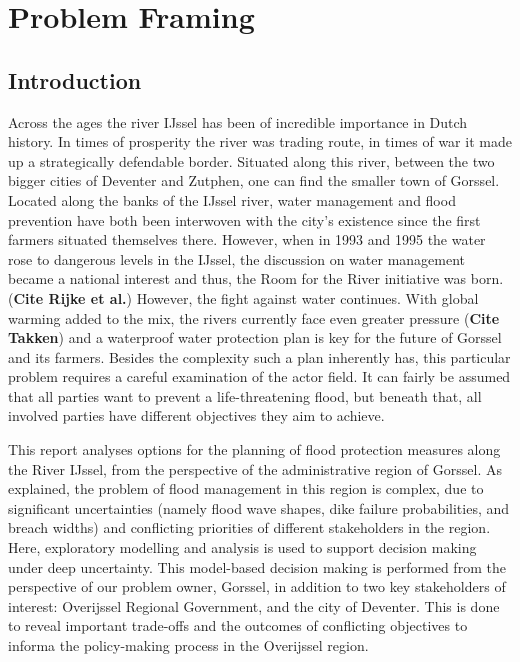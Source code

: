 \section{Problem Framing}
\label{s:prob_frame}
\subsection{Introduction}
Across the ages the river IJssel has been of incredible importance in Dutch history. In times of prosperity the river was trading route, in times of war it made up a strategically defendable border. Situated along this river, between the two bigger cities of Deventer and Zutphen, one can find the smaller town of Gorssel. Located along the banks of the IJssel river, water management and flood prevention have both been interwoven with the city's existence since the first farmers situated themselves there. However, when in 1993 and 1995 the water rose to dangerous levels in the IJssel, the discussion on water management became a national interest and thus, the Room for the River initiative was born. (\textbf{Cite Rijke et al.}) However, the fight against water continues. With global warming added to the mix, the rivers currently face even greater pressure (\textbf{Cite Takken}) and a waterproof water protection plan is key for the future of Gorssel and its farmers. Besides the complexity such a plan inherently has, this particular problem requires a careful examination of the actor field. It can fairly be assumed that all parties want to prevent a life-threatening flood, but beneath that, all involved parties have different objectives they aim to achieve. 

This report analyses options for the planning of flood protection measures along the River IJssel, from the perspective of the administrative region of Gorssel. As explained, the problem of flood management in this region is complex, due to significant uncertainties (namely flood wave shapes, dike failure probabilities, and breach widths) and conflicting priorities of different stakeholders in the region. Here, exploratory modelling and analysis is used to support decision making under deep uncertainty. This model-based decision making is performed from the perspective of our problem owner, Gorssel, in addition to two key stakeholders of interest: Overijssel Regional Government, and the city of Deventer. This is done to reveal important trade-offs and the outcomes of conflicting objectives to informa the policy-making process in the Overijssel region.


